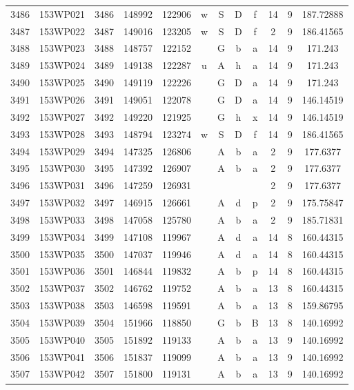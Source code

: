 \begin{tabular}{|*{12}{c|}}
3486 & 153WP021 & 3486 & 148992 & 122906 & w & S & D & f & 14 & 9 & 187.72888 \\ 
3487 & 153WP022 & 3487 & 149016 & 123205 & w & S & D & f & 2 & 9 & 186.41565 \\ 
3488 & 153WP023 & 3488 & 148757 & 122152 &  & G & b & a & 14 & 9 & 171.243 \\ 
3489 & 153WP024 & 3489 & 149138 & 122287 & u & A & h & a & 14 & 9 & 171.243 \\ 
3490 & 153WP025 & 3490 & 149119 & 122226 &  & G & D & a & 14 & 9 & 171.243 \\ 
3491 & 153WP026 & 3491 & 149051 & 122078 &  & G & D & a & 14 & 9 & 146.14519 \\ 
3492 & 153WP027 & 3492 & 149220 & 121925 &  & G & h & x & 14 & 9 & 146.14519 \\ 
3493 & 153WP028 & 3493 & 148794 & 123274 & w & S & D & f & 14 & 9 & 186.41565 \\ 
3494 & 153WP029 & 3494 & 147325 & 126806 &  & A & b & a & 2 & 9 & 177.6377 \\ 
3495 & 153WP030 & 3495 & 147392 & 126907 &  & A & b & a & 2 & 9 & 177.6377 \\ 
3496 & 153WP031 & 3496 & 147259 & 126931 &  &  &  &  & 2 & 9 & 177.6377 \\ 
3497 & 153WP032 & 3497 & 146915 & 126661 &  & A & d & p & 2 & 9 & 175.75847 \\ 
3498 & 153WP033 & 3498 & 147058 & 125780 &  & A & b & a & 2 & 9 & 185.71831 \\ 
3499 & 153WP034 & 3499 & 147108 & 119967 &  & A & d & a & 14 & 8 & 160.44315 \\ 
3500 & 153WP035 & 3500 & 147037 & 119946 &  & A & d & a & 14 & 8 & 160.44315 \\ 
3501 & 153WP036 & 3501 & 146844 & 119832 &  & A & b & p & 14 & 8 & 160.44315 \\ 
3502 & 153WP037 & 3502 & 146762 & 119752 &  & A & b & a & 13 & 8 & 160.44315 \\ 
3503 & 153WP038 & 3503 & 146598 & 119591 &  & A & b & a & 13 & 8 & 159.86795 \\ 
3504 & 153WP039 & 3504 & 151966 & 118850 &  & G & b & B & 13 & 8 & 140.16992 \\ 
3505 & 153WP040 & 3505 & 151892 & 119133 &  & A & b & a & 13 & 9 & 140.16992 \\ 
3506 & 153WP041 & 3506 & 151837 & 119099 &  & A & b & a & 13 & 9 & 140.16992 \\ 
3507 & 153WP042 & 3507 & 151800 & 119131 &  & A & b & a & 13 & 9 & 140.16992 \\ 

\end{tabular}

